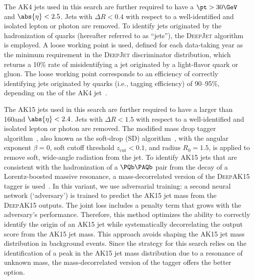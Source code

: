 The AK4 jets used in this search are further required to have a $\pt > 30\GeV$ and $\abs{\eta} < 2.5$. Jets with $\Delta R < 0.4$ with respect to a well-identified and isolated lepton or photon are removed. To identify jets originated by the hadronization of \PQb quarks (hereafter referred to as ``\PQb jets''), the \textsc{DeepJet} algorithm~\cite{Bols:2020bkb} is employed. A loose working point is used, defined for each data-taking year as the minimum requirement in the \textsc{DeepJet} discriminator distribution, which returns a 10\% rate of misidentifying a jet originated by a light-flavor quark or gluon. The loose working point corresponds to an efficiency of correctly identifying jets originated by \PQb quarks (i.e., \PQb tagging efficiency) of 90--95\%, depending on the \pt of the AK4 jet~\cite{CMS-DP-2023-005}.

The AK15 jets used in this search are further required to have a \pt larger than 160\GeV and $\abs{\eta} < 2.4$. Jets with $\Delta R < 1.5$ with respect to a well-identified and isolated lepton or photon are removed. The modified mass drop tagger algorithm~\cite{Dasgupta:2013ihk,Butterworth:2008iy}, also known as the soft-drop (SD) algorithm~\cite{msd}, with the angular exponent $\beta = 0$, soft cutoff threshold $z_{\text{cut}} < 0.1$, and radius $R_{0} = 1.5$, is applied to remove soft, wide-angle radiation from the jet. 
To identify AK15 jets that are consistent with the hadronization of a $\PQb\PAQb$ pair from the decay of a Lorentz-boosted massive resonance, 
a mass-decorrelated version of the \textsc{DeepAK15} tagger is used~\cite{Sirunyan:2020lcu,Louppe:2016ylz}. 
In this variant, we use adversarial training: a second neural network (`adversary') is trained to predict the AK15 jet mass from the \textsc{DeepAK15} outputs. The joint loss includes a penalty term that grows with the adversary's performance. Therefore, this method optimizes the ability to correctly identify the origin of an AK15 jet while systematically decorrelating the output score from the AK15 jet mass. This approach avoids shaping the AK15 jet mass distribution in background events. Since the strategy for this search relies on the identification of a peak in the AK15 jet mass distribution due to a resonance of unknown mass, the mass-decorrelated version of the tagger offers the better option. 


